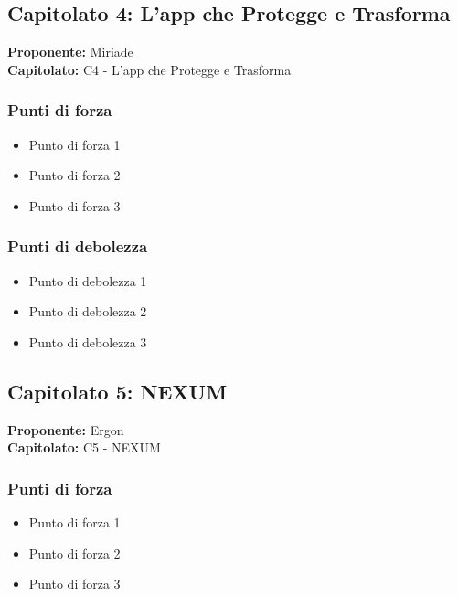 \documentclass[a4paper,12pt]{article}
\begin{document}
\subsection{Capitolato 4: L'app che Protegge e Trasforma}

\begin{tcolorbox}[colback=lightgray!30,colframe=darkgray,arc=2mm,boxrule=0.3pt]
\textbf{Proponente:} Miriade \\
\textbf{Capitolato:} C4 - L'app che Protegge e Trasforma
\end{tcolorbox}

\subsubsection{Punti di forza}
\begin{itemize}
\item Punto di forza 1
\item Punto di forza 2
\item Punto di forza 3
\end{itemize}

\subsubsection{Punti di debolezza}
\begin{itemize}
\item Punto di debolezza 1
\item Punto di debolezza 2
\item Punto di debolezza 3
\end{itemize}

\subsection{Capitolato 5: NEXUM}

\begin{tcolorbox}[colback=lightgray!30,colframe=darkgray,arc=2mm,boxrule=0.3pt]
\textbf{Proponente:} Ergon \\
\textbf{Capitolato:} C5 - NEXUM
\end{tcolorbox}

\subsubsection{Punti di forza}
\begin{itemize}
\item Punto di forza 1
\item Punto di forza 2
\item Punto di forza 3
\end{itemize}
\end{document}
